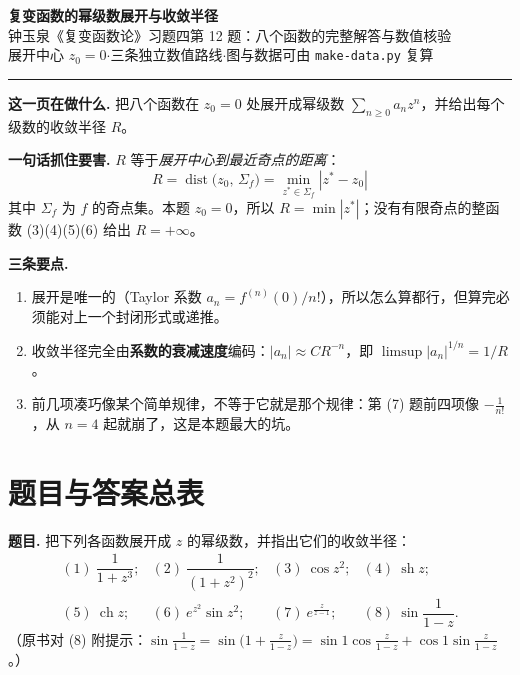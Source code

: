 \documentclass[11pt,a4paper]{ctexart}
\theoremstyle{definition}
\providecommand{\sh}{\operatorname{sh}}
\providecommand{\ch}{\operatorname{ch}}
\begin{document}
\begin{center}
{\LARGE\bfseries\color{keyblue} 复变函数的幂级数展开与收敛半径}\\[1.0ex]
{\large 钟玉泉《复变函数论》习题四第 12 题：八个函数的完整解答与数值核验}\\[0.9ex]
{\small 展开中心 $z_0=0$\quad$\cdot$\quad 三条独立数值路线\quad$\cdot$\quad 图与数据可由 \texttt{make-data.py} 复算}
\end{center}
\vspace{0.4ex}
\hrule
\vspace{1.2ex}

\begin{ideabox}[读前必读]
\textbf{这一页在做什么.} 把八个函数在 $z_0=0$ 处展开成幂级数 $\sum_{n\ge0}a_nz^n$，并给出每个级数的收敛半径 $R$。

\textbf{一句话抓住要害.} $R$ 等于\emph{展开中心到最近奇点的距离}：
\[
\boxed{\;R=\operatorname{dist}\bigl(z_0,\,\Sigma_f\bigr)=\min_{z^\ast\in\Sigma_f}|z^\ast-z_0|\;}
\]
其中 $\Sigma_f$ 为 $f$ 的奇点集。本题 $z_0=0$，所以 $R=\min|z^\ast|$；没有有限奇点的整函数 (3)(4)(5)(6) 给出 $R=+\infty$。

\textbf{三条要点.}
\begin{enumerate}[leftmargin=1.6em,itemsep=0.15ex,topsep=0.3ex]
\item 展开是唯一的（Taylor 系数 $a_n=f^{(n)}(0)/n!$），所以怎么算都行，但算完必须能对上一个封闭形式或递推。
\item 收敛半径完全由\textbf{系数的衰减速度}编码：$|a_n|\approx C R^{-n}$，即 $\limsup|a_n|^{1/n}=1/R$。
\item 前几项凑巧像某个简单规律，不等于它就是那个规律：第 (7) 题前四项像 $-\frac1{n!}$，从 $n=4$ 起就崩了，这是本题最大的坑。
\end{enumerate}
\end{ideabox}

\section{题目与答案总表}

\textbf{题目.} 把下列各函数展开成 $z$ 的幂级数，并指出它们的收敛半径：
\[
\begin{array}{llll}
(1)\ \dfrac{1}{1+z^3}; & (2)\ \dfrac{1}{(1+z^2)^2}; & (3)\ \cos z^2; & (4)\ \sh z;\\[1.4ex]
(5)\ \ch z; & (6)\ e^{z^2}\sin z^2; & (7)\ e^{\frac{z}{z-1}}; & (8)\ \sin\dfrac{1}{1-z}.
\end{array}
\]
（原书对 (8) 附提示：$\sin\frac{1}{1-z}=\sin\bigl(1+\frac{z}{1-z}\bigr)=\sin1\cos\frac{z}{1-z}+\cos1\sin\frac{z}{1-z}$。）
\end{document}
